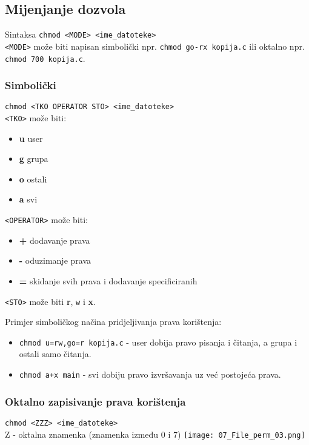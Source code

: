\subsection*{Mijenjanje dozvola}
Sintaksa \texttt{chmod <MODE> <ime\_datoteke>}
\\
\texttt{<MODE>} može biti napisan simbolički npr. \texttt{chmod go-rx kopija.c} ili oktalno npr. \texttt{chmod 700 kopija.c}.\\
\subsubsection*{Simbolički}\texttt{chmod <TKO OPERATOR STO> <ime\_datoteke>}\\
\texttt{<TKO>} može biti:
\begin{itemize}
 \item \textbf{u} user
\item \textbf{g} grupa
\item \textbf{o} ostali
\item \textbf{a} svi
\end{itemize}
\texttt{<OPERATOR>} može biti:
\begin{itemize}
 \item \textbf{+} dodavanje prava
\item \textbf{-} oduzimanje prava
\item \textbf{=} skidanje svih prava i dodavanje specificiranih
\end{itemize}
\texttt{<STO>} može biti \textbf{r}, \texttt{w} i \textbf{x}.

\begin{primjer}{Primjer simboličkog načina pridjeljivanja prava korištenja:}
\begin{itemize}
 \item \texttt{chmod u=rw,go=r kopija.c} - user dobija pravo pisanja i čitanja, a grupa i ostali samo čitanja.
\item \texttt{chmod a+x main} - svi dobiju pravo izvršavanja uz već postojeća prava.
\end{itemize}
\end{primjer}
\subsubsection*{Oktalno zapisivanje prava korištenja}
\texttt{chmod <ZZZ> <ime\_datoteke>}\\
Z - oktalna znamenka (znamenka između 0 i 7)
\texttt{[image: 07\_File\_perm\_03.png]}

